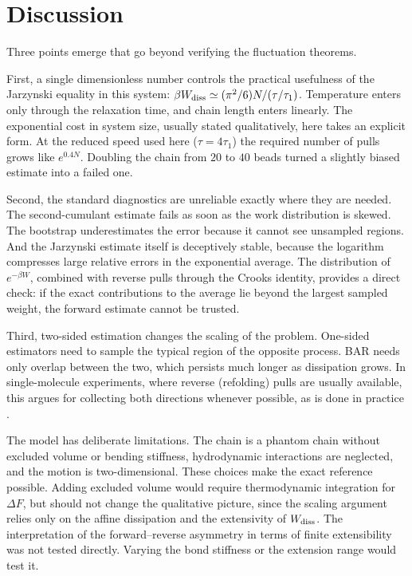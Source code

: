 \documentclass[11pt,a4paper]{article}
\newcommand{\Wd}{W_{\rm diss}}
\begin{document}
\section{Discussion}

Three points emerge that go beyond verifying the fluctuation theorems.

First, a single dimensionless number controls the practical usefulness of the Jarzynski equality in this
system: $\beta\Wd\simeq(\pi^2/6)N/(\tau/\tau_1)$. Temperature enters only through the relaxation time, and
chain length enters linearly. The exponential cost in system size, usually stated qualitatively, here takes
an explicit form. At the reduced speed used here ($\tau=4\tau_1$) the required number of pulls grows like
$e^{0.4N}$.
Doubling the chain from $20$ to $40$ beads turned a slightly biased estimate into a failed one.

Second, the standard diagnostics are unreliable exactly where they are needed. The second-cumulant
estimate fails as soon as the work distribution is skewed. The bootstrap underestimates the error because it
cannot see unsampled regions. And the Jarzynski estimate itself is deceptively stable, because the
logarithm compresses large relative errors in the exponential average. The distribution of
$e^{-\beta W}$, combined with reverse pulls through the Crooks identity, provides a direct check: if the
exact contributions to the average lie beyond the largest sampled weight, the forward estimate cannot be trusted.

Third, two-sided estimation changes the scaling of the problem. One-sided estimators need to sample the
typical region of the opposite process. BAR needs only overlap between the two, which persists much longer as
dissipation grows. In single-molecule experiments, where reverse (refolding) pulls are usually available,
this argues for collecting both directions whenever possible, as is done in practice \cite{C05}.

The model has deliberate limitations. The chain is a phantom chain without excluded volume or bending
stiffness, hydrodynamic interactions are neglected, and the motion is two-dimensional. These choices make
the exact reference possible. Adding excluded volume would require thermodynamic integration for $\Delta F$, but
should not change the qualitative picture, since the scaling argument relies only on the affine dissipation
and the extensivity of $\Wd$. The interpretation of the forward--reverse asymmetry in terms of
finite extensibility was not tested directly. Varying the bond stiffness or the extension range would test it.
\end{document}
